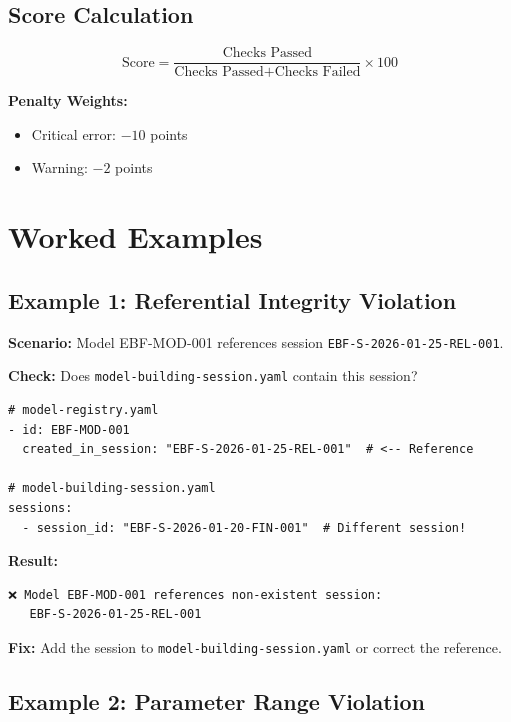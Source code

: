 \subsection{Score Calculation}

\begin{equation}
\text{Score} = \frac{\text{Checks Passed}}{\text{Checks Passed} + \text{Checks Failed}} \times 100
\end{equation}

\textbf{Penalty Weights:}
\begin{itemize}
    \item Critical error: $-10$ points
    \item Warning: $-2$ points
\end{itemize}

\section{Worked Examples}
\label{sec:vc-examples}

\subsection{Example 1: Referential Integrity Violation}

\textbf{Scenario:} Model EBF-MOD-001 references session \texttt{EBF-S-2026-01-25-REL-001}.

\textbf{Check:} Does \texttt{model-building-session.yaml} contain this session?

\begin{verbatim}
# model-registry.yaml
- id: EBF-MOD-001
  created_in_session: "EBF-S-2026-01-25-REL-001"  # <-- Reference

# model-building-session.yaml
sessions:
  - session_id: "EBF-S-2026-01-20-FIN-001"  # Different session!
\end{verbatim}

\textbf{Result:}
\begin{verbatim}
❌ Model EBF-MOD-001 references non-existent session:
   EBF-S-2026-01-25-REL-001
\end{verbatim}

\textbf{Fix:} Add the session to \texttt{model-building-session.yaml} or correct the reference.

\subsection{Example 2: Parameter Range Violation}

